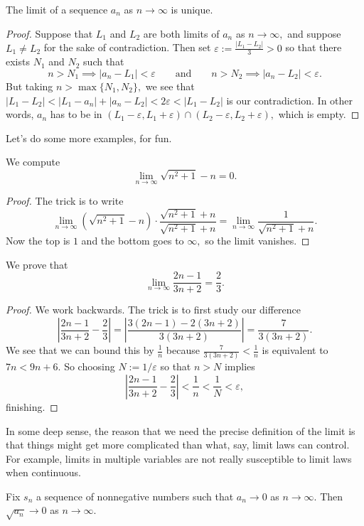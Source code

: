 \begin{proposition}
	The limit of a sequence $a_n$ as $n\to\infty$ is unique.
\end{proposition}
\begin{proof}
	Suppose that $L_1$ and $L_2$ are both limits of $a_n$ as $n\to\infty,$ and suppose $L_1\ne L_2$ for the sake of contradiction. Then set $\varepsilon:=\frac{|L_1-L_2|}3>0$ so that there exists $N_1$ and $N_2$ such that
	\[n>N_1\implies|a_n-L_1|<\varepsilon\qquad\text{and}\qquad n>N_2\implies|a_n-L_2|<\varepsilon.\]
	But taking $n>\max\{N_1,N_2\},$ we see that $|L_1-L_2|<|L_1-a_n|+|a_n-L_2|<2\varepsilon<|L_1-L_2|$ is our contradiction. In other words, $a_n$ has to be in $(L_1-\varepsilon,L_1+\varepsilon)\cap(L_2-\varepsilon,L_2+\varepsilon),$ which is empty.
\end{proof}
Let's do some more examples, for fun.
\begin{exercise}[Ross 7.5(a)]
	We compute
	\[\lim_{n\to\infty}\sqrt{n^2+1}-n=0.\]
\end{exercise}
\begin{proof}
	The trick is to write
	\[\lim_{n\to\infty}\left(\sqrt{n^2+1}-n\right)\cdot\frac{\sqrt{n^2+1}+n}{\sqrt{n^2+1}+n}=\lim_{n\to\infty}\frac1{\sqrt{n^2+1}+n}.\]
	Now the top is $1$ and the bottom goes to $\infty,$ so the limit vanishes.
\end{proof}
\begin{exercise}
	We prove that
	\[\lim_{n\to\infty}\frac{2n-1}{3n+2}=\frac23.\]
\end{exercise}
\begin{proof}
	We work backwards. The trick is to first study our difference
	\[\left|\frac{2n-1}{3n+2}-\frac23\right|=\left|\frac{3(2n-1)-2(3n+2)}{3(3n+2)}\right|=\frac7{3(3n+2)}.\]
	We see that we can bound this by $\frac1n$ because $\frac7{3(3n+2)}<\frac1n$ is equivalent to $7n<9n+6.$ So choosing $\boxed{N:=1/\varepsilon}$ so that $n>N$ implies
	\[\left|\frac{2n-1}{3n+2}-\frac23\right|<\frac1n<\frac1N<\varepsilon,\]
	finishing.
\end{proof}
\begin{remark}[Philosophy]
	In some deep sense, the reason that we need the precise definition of the limit is that things might get more complicated than what, say, limit laws can control. For example, limits in multiple variables are not really susceptible to limit laws when continuous.
\end{remark}
\begin{exercise}[Ross 8.3]
	Fix $s_n$ a sequence of nonnegative numbers such that $a_n\to0$ as $n\to\infty.$ Then $\sqrt{a_n}\to0$ as $n\to\infty.$
\end{exercise}
